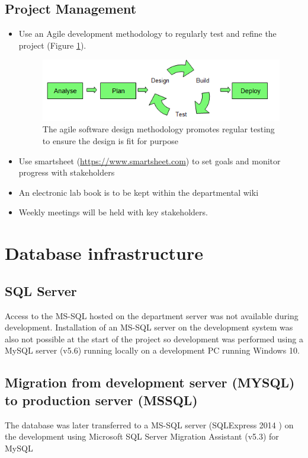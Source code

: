 \subsection{Project Management}
\begin{itemize}
\item Use an Agile development methodology to regularly test and refine the project (Figure \ref{fig:Agile}).
\begin{figure}[h]
\centering
\includegraphics[width=1\linewidth]{./Figures/Agile}
\caption[Agile development methodology]{The agile software design methodology promotes regular testing to ensure the design is fit for purpose}
\label{fig:Agile}
\end{figure}
\item Use smartsheet (\url{https://www.smartsheet.com}) to set goals and monitor progress with stakeholders 
\item An electronic lab book is to be kept within the departmental wiki
\item Weekly meetings will be held with key stakeholders.
\end{itemize}

\section{Database infrastructure}
\subsection{SQL Server}
Access to the MS-SQL hosted on the department server was not available during development. Installation of an MS-SQL server on the development system was also not possible at the start of the project so development was performed using a MySQL server (v5.6)\cite{mysql_mysql_????} running locally on a development PC running Windows 10. 

\subsection{Migration from development server (MYSQL) to production server (MSSQL)}
The database was later transferred to a MS-SQL server (SQLExpress 2014 \cite{_sql_????}) on the development using Microsoft SQL Server Migration Assistant (v5.3) for MySQL \cite{_microsoft_????}
